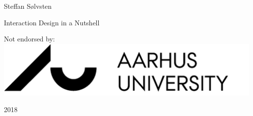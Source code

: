 \begin{titlepage}
  \begin{adjustwidth*}{}{}
    \raggedleft

    \vspace*{1cm}
    {\LARGE Steffan Sølvsten}
    
    \vspace*{2cm}
    {\Huge Interaction Design in a Nutshell}

    \vspace*{14cm}
    {\small Not endorsed by: }
    \includegraphics[scale=0.09]{img/aulogo_uk_var2_black.png}
    
    \vspace*{0.2cm}
    {\large 2018}
  \end{adjustwidth*}
\end{titlepage}
